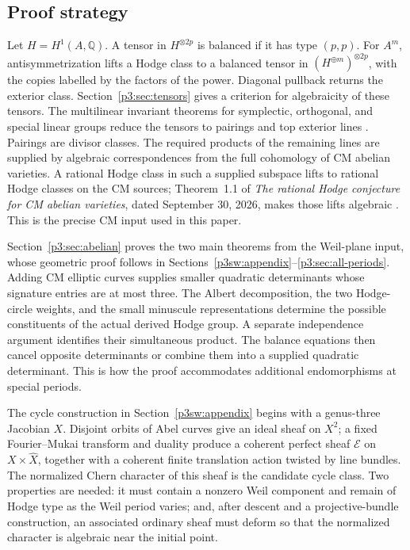 \documentclass[11pt]{article}
\newcommand{\Q}{\mathbb Q}
\numberwithin{equation}{section}
\begin{document}
\subsection{Proof strategy}

Let \(H=H^1(A,\Q)\). A tensor in \(H^{\otimes 2p}\) is balanced if it
has type \((p,p)\). For \(A^m\), antisymmetrization lifts a Hodge class to
a balanced tensor in \((H^{\oplus m})^{\otimes 2p}\), with the copies
labelled by the factors of the power. Diagonal pullback returns the exterior
class. Section~\ref{p3:sec:tensors} gives a
criterion for algebraicity of these tensors. The multilinear invariant
theorems for symplectic, orthogonal, and special linear groups reduce the
tensors to pairings and top exterior lines
\cite{LehrerZhang2015,LehrerZhang2017,Schrijver2008}. Pairings are divisor
classes. The required products of the remaining lines are supplied by algebraic correspondences
from the full cohomology of CM abelian varieties. A rational Hodge class in
such a supplied subspace lifts to rational Hodge classes on the CM sources;
Theorem~1.1 of \emph{The rational Hodge conjecture for CM abelian
varieties}, dated September 30, 2026, makes those lifts algebraic
\cite{OpenAICM2026}. This is the precise CM input used in this paper.

Section~\ref{p3:sec:abelian} proves the two main theorems from the
Weil-plane input, whose geometric proof follows in
Sections~\ref{p3sw:appendix}--\ref{p3:sec:all-periods}.
Adding CM elliptic curves supplies smaller quadratic determinants whose
signature entries are at most three. The Albert decomposition, the two
Hodge-circle weights, and the small minuscule representations determine
the possible constituents of the actual derived Hodge group. A separate
independence argument identifies their simultaneous product. The balance
equations then cancel opposite determinants or combine them into a
supplied quadratic determinant. This is how the proof accommodates
additional endomorphisms at special periods.

The cycle construction in Section~\ref{p3sw:appendix} begins with a
genus-three Jacobian \(X\). Disjoint
orbits of Abel curves give an ideal sheaf on \(X^2\); a fixed
Fourier--Mukai transform and duality produce a coherent perfect sheaf
\(\mathcal E\) on \(X\times\widehat X\), together with a coherent finite
translation action twisted by line bundles. The normalized Chern character
of this sheaf is the candidate cycle class. Two properties are needed: it
must contain a nonzero Weil component and remain of Hodge type as the Weil
period varies; and, after descent and a projective-bundle construction, an
associated ordinary sheaf must deform so that the normalized character is
algebraic near the initial point.
\end{document}
